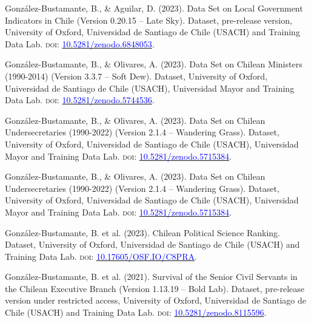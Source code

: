 \begin{publications}

\begin{benumerate}{6}

\item{\small González-Bustamante, B., \& Aguilar, D. (2023). Data Set on Local Government Indicators in Chile (Version 0.20.15 -- Late Sky). Dataset, pre-release version, University of Oxford, Universidad de Santiago de Chile (USACH) and Training Data Lab. {\scshape doi:} \href{https://doi.org/10.5281/zenodo.6848053}{\textcolor{blue}{10.5281/zenodo.6848053}}.}\vspace{1mm}

\item{\small González-Bustamante, B., \& Olivares, A. (2023). Data Set on Chilean Ministers (1990-2014) (Version 3.3.7 -- Soft Dew). Dataset, University of Oxford, Universidad de Santiago de Chile (USACH), Universidad Mayor and Training Data Lab. {\scshape doi:} \href{https://doi.org/10.5281/zenodo.5744536}{\textcolor{blue}{10.5281/zenodo.5744536}}.}\vspace{1mm}

\item{\small González-Bustamante, B., \& Olivares, A. (2023). Data Set on Chilean Undersecretaries (1990-2022) (Version 2.1.4 -- Wandering Grass). Dataset, University of Oxford, Universidad de Santiago de Chile (USACH), Universidad Mayor and Training Data Lab. {\scshape doi:} \href{https://doi.org/10.5281/zenodo.5715384}{\textcolor{blue}{10.5281/zenodo.5715384}}.}\vspace{1mm}

\item{\small González-Bustamante, B., \& Olivares, A. (2023). Data Set on Chilean Undersecretaries (1990-2022) (Version 2.1.4 -- Wandering Grass). Dataset, University of Oxford, Universidad de Santiago de Chile (USACH), Universidad Mayor and Training Data Lab. {\scshape doi:} \href{https://doi.org/10.5281/zenodo.5715384}{\textcolor{blue}{10.5281/zenodo.5715384}}.}\vspace{1mm}

\item{\small González-Bustamante, B. et al. (2023). Chilean Political Science Ranking. Dataset, University of Oxford, Universidad de Santiago de Chile (USACH) and Training Data Lab. {\scshape doi:} \href{http://doi.org/10.17605/OSF.IO/C8PRA}{\textcolor{blue}{10.17605/OSF.IO/C8PRA}}.}\vspace{1mm}

\item{\small González-Bustamante, B. et al. (2021). Survival of the Senior Civil Servants in the Chilean Executive Branch (Version 1.13.19 -- Bold Lab). Dataset, pre-release version under restricted access, University of Oxford, Universidad de Santiago de Chile (USACH) and Training Data Lab. {\scshape doi:} \href{https://doi.org/10.5281/zenodo.8115596}{\textcolor{blue}{10.5281/zenodo.8115596}}.}\vspace{1mm}

\end{benumerate}

\end{publications}

